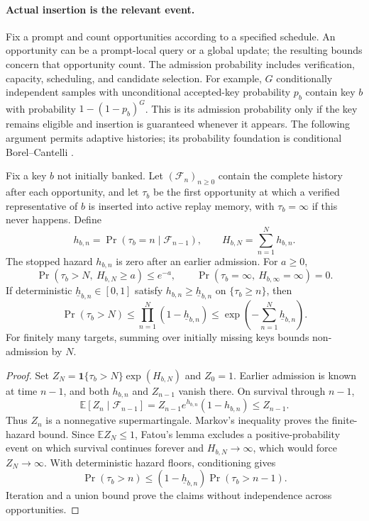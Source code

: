 \paragraph{Actual insertion is the relevant event.}
Fix a prompt and count opportunities according to a specified schedule.
An opportunity can be a prompt-local query or a global update; the resulting
bounds concern that opportunity count. The admission probability includes
verification, capacity, scheduling, and candidate selection. For example,
$G$ conditionally independent samples with unconditional accepted-key probability $p_b$
contain key $b$ with probability $1-(1-p_b)^G$. This is its admission
probability only if the key remains eligible and insertion is guaranteed
whenever it appears. The following argument permits adaptive histories;
its probability foundation is conditional Borel--Cantelli
\citep[Theorem~4.3.4]{durrett2019probability}.

\begin{lemma}
\label{ext:lem-admission-hazards}
Fix a key $b$ not initially banked. Let $(\mathcal F_n)_{n\ge0}$ contain the
complete history after each opportunity, and let $\tau_b$ be the first
opportunity at which a verified representative of $b$ is inserted into active
replay memory, with $\tau_b=\infty$ if this never happens. Define
\[
 h_{b,n}=\Pr(\tau_b=n\mid\mathcal F_{n-1}),\qquad
 H_{b,N}=\sum_{n=1}^N h_{b,n}.
\]
The stopped hazard $h_{b,n}$ is zero after an earlier admission. For $a\ge0$,
\begin{equation}
 \Pr(\tau_b>N,\ H_{b,N}\ge a)\le e^{-a},\qquad
 \Pr(\tau_b=\infty,\ H_{b,\infty}=\infty)=0.
 \label{ext:eq-admission-hazards}
\end{equation}
If deterministic $\underline h_{b,n}\in[0,1]$ satisfy
$h_{b,n}\ge\underline h_{b,n}$ on $\{\tau_b\ge n\}$, then
\begin{equation}
 \Pr(\tau_b>N)\le\prod_{n=1}^N(1-\underline h_{b,n})
 \le\exp\!\left(-\sum_{n=1}^N\underline h_{b,n}\right).
 \label{ext:eq-admission-floors}
\end{equation}
For finitely many targets, summing over initially missing keys bounds
non-admission by $N$.
\end{lemma}
\begin{proof}
Set $Z_N=\mathbf1\{\tau_b>N\}\exp(H_{b,N})$ and $Z_0=1$. Earlier admission
is known at time $n-1$, and both $h_{b,n}$ and $Z_{n-1}$ vanish there.
On survival through $n-1$,
\[
 \mathbb E[Z_n\mid\mathcal F_{n-1}]
 =Z_{n-1}e^{h_{b,n}}(1-h_{b,n})\le Z_{n-1}.
\]
Thus $Z_n$ is a nonnegative supermartingale. Markov's inequality proves the
finite-hazard bound. Since $\mathbb E Z_N\le1$, Fatou's lemma excludes a
positive-probability event on which survival continues forever and
$H_{b,N}\to\infty$, which would force $Z_N\to\infty$. With deterministic
hazard floors, conditioning gives
\[
 \Pr(\tau_b>n)\le(1-\underline h_{b,n})\Pr(\tau_b>n-1).
\]
Iteration and a union bound prove the claims without independence across
opportunities.
\end{proof}

